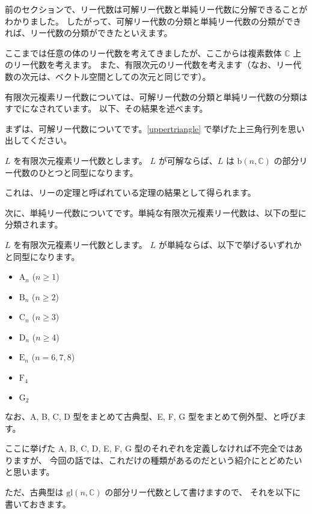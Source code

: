 \documentclass{ltjsarticle}
\begin{document}
前のセクションで、リー代数は可解リー代数と単純リー代数に分解できることがわかりました。
したがって、可解リー代数の分類と単純リー代数の分類ができれば、リー代数の分類ができたといえます。

ここまでは任意の体のリー代数を考えてきましたが、ここからは複素数体 \(\mathbb{C}\) 上のリー代数を考えます。
また、有限次元のリー代数を考えます（なお、リー代数の次元は、ベクトル空間としての次元と同じです）。

有限次元複素リー代数については、可解リー代数の分類と単純リー代数の分類はすでになされています。
以下、その結果を述べます。

まずは、可解リー代数についてです。\cref{uppertriangle} で挙げた上三角行列を思い出してください。

\begin{theorem}[可解リー代数の分類]
    \(L\) を有限次元複素リー代数とします。
    \(L\) が可解ならば、\(L\) は \(\mathrm{b}(n,\mathbb{C})\) の部分リー代数のひとつと同型になります。
\end{theorem}

これは、リーの定理と呼ばれている定理の結果として得られます。

次に、単純リー代数についてです。単純な有限次元複素リー代数は、以下の型に分類されます。

\begin{theorem}[単純リー代数の分類]
    \(L\) を有限次元複素リー代数とします。
    \(L\) が単純ならば、以下で挙げるいずれかと同型になります。
    \begin{itemize}
        \item \(\mathrm{A}_n\) (\(n \geq 1\))
        \item \(\mathrm{B}_n\) (\(n \geq 2\))
        \item \(\mathrm{C}_n\) (\(n \geq 3\))
        \item \(\mathrm{D}_n\) (\(n \geq 4\))
        \item \(\mathrm{E}_n\) (\(n = 6,7,8\))
        \item \(\mathrm{F}_4\)
        \item \(\mathrm{G}_2\)
    \end{itemize}
    なお、A, B, C, D 型をまとめて古典型、E, F, G 型をまとめて例外型、と呼びます。
\end{theorem}

ここに挙げた A, B, C, D, E, F, G 型のそれぞれを定義しなければ不完全ではありますが、
今回の話では、これだけの種類があるのだという紹介にとどめたいと思います。

ただ、古典型は \(\mathrm{gl}(n,\mathbb{C})\) の部分リー代数として書けますので、
それを以下に書いておきます。
\end{document}

